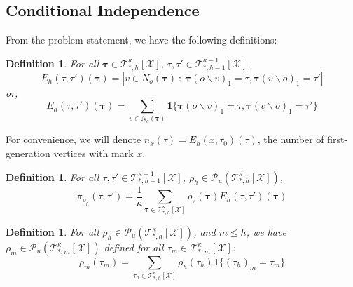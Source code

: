 \documentclass[12pt]{article}
\newtheorem{definition}[theorem]{Definition}
\newcommand{\TB}{{ \boldsymbol\tau}}
\numberwithin{equation}{section}
\begin{document}
\subsection{Conditional Independence}
From the problem statement, we have the following definitions:
\begin{definition}
    For all $\TB\in \mathcal{T}_{*, h}^\kappa[\mathcal{X}]$, $\tau, \tau'\in \mathcal{T}_{*, h-1}^{\kappa-1}[\mathcal{X}]$,
    \begin{equation*}
        E_h(\tau, \tau')(\TB) = |v\in N_o(\TB)\ :\ \TB(o\backslash v)_1 = \tau, \TB(v\backslash o)_1 = \tau'|
    \end{equation*}
    or,
    \begin{equation*}
        E_h(\tau, \tau')(\TB) = \sum_{v\in N_o(\TB)}\mathbf{1}\{\TB(o\backslash v)_1 = \tau, \TB(v\backslash o)_1 = \tau'\}
    \end{equation*}
\end{definition}
For convenience, we will denote $n_x(\tau) = E_h(x, \tau_0)(\tau)$, the number of first-generation vertices with mark $x$.

\begin{definition}
    For all $\tau, \tau'\in \mathcal{T}_{*, h-1}^{\kappa-1}[\mathcal{X}]$, $\rho_h\in \mathcal{P}_u(\mathcal{T}_{*, h}^\kappa[\mathcal{X}])$,
    \begin{equation*}
        \pi_{\rho_h}(\tau, \tau') = \frac1\kappa \sum_{\TB\in \mathcal{T}_{*, h}^\kappa[\mathcal{X}]} \rho_2(\TB) E_h(\tau, \tau')(\TB)
    \end{equation*}
\end{definition}


\begin{definition}
    For all $\rho_h\in \mathcal{P}_u(\mathcal{T}_{*, h}^\kappa[\mathcal{X}])$, and $m\leq h$, we have
    $\rho_m\in \mathcal{P}_u(\mathcal{T}_{*, m}^\kappa[\mathcal{X}])$ defined for all $\tau_m \in \mathcal{T}_{*, m}^\kappa[\mathcal{X}]$:
    \begin{equation*}
        \rho_m(\tau_m) = \sum_{\tau_h\in \mathcal{T}_{*, h}^\kappa[\mathcal{X}]} \rho_h(\tau_h)\mathbf{1}\{(\tau_h)_m = \tau_m\}
    \end{equation*}
\end{definition}
\end{document}
